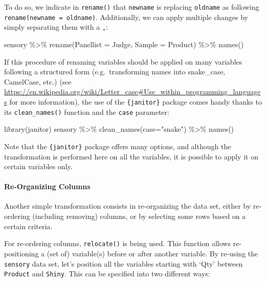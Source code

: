 \documentclass[
]{book}
\newenvironment{Shaded}{\begin{snugshade}}{\end{snugshade}}
\newcommand{\AttributeTok}[1]{\textcolor[rgb]{0.77,0.63,0.00}{#1}}
\newcommand{\FunctionTok}[1]{\textcolor[rgb]{0.00,0.00,0.00}{#1}}
\newcommand{\NormalTok}[1]{#1}
\newcommand{\SpecialCharTok}[1]{\textcolor[rgb]{0.00,0.00,0.00}{#1}}
\newcommand{\StringTok}[1]{\textcolor[rgb]{0.31,0.60,0.02}{#1}}
\begin{document}
To do so, we indicate in \texttt{rename()} that \texttt{newname} is replacing \texttt{oldname} as following \texttt{rename(newname\ =\ oldname)}. Additionally, we can apply multiple changes by simply separating them with a \texttt{,}:

\begin{Shaded}
\begin{Highlighting}[]
\NormalTok{sensory }\SpecialCharTok{\%\textgreater{}\%} 
  \FunctionTok{rename}\NormalTok{(}\AttributeTok{Panellist =}\NormalTok{ Judge, }\AttributeTok{Sample =}\NormalTok{ Product) }\SpecialCharTok{\%\textgreater{}\%} 
  \FunctionTok{names}\NormalTok{()}
\end{Highlighting}
\end{Shaded}

If this procedure of renaming variables should be applied on many variables following a structured form (e.g.~transforming names into snake\_case, CamelCase, etc.) (see \url{https://en.wikipedia.org/wiki/Letter_case\#Use_within_programming_languages} for more information), the use of the \texttt{\{janitor\}} package comes handy thanks to its \texttt{clean\_names()} function and the \texttt{case} parameter:

\begin{Shaded}
\begin{Highlighting}[]
\FunctionTok{library}\NormalTok{(janitor)}
\NormalTok{sensory }\SpecialCharTok{\%\textgreater{}\%} 
  \FunctionTok{clean\_names}\NormalTok{(}\AttributeTok{case=}\StringTok{"snake"}\NormalTok{) }\SpecialCharTok{\%\textgreater{}\%} 
  \FunctionTok{names}\NormalTok{()}
\end{Highlighting}
\end{Shaded}

Note that the \texttt{\{janitor\}} package offers many options, and although the transformation is performed here on all the variables, it is possible to apply it on certain variables only.

\hypertarget{re-organizing-columns}{%
\paragraph{Re-Organizing Columns}\label{re-organizing-columns}}

Another simple transformation consists in re-organizing the data set, either by re-ordering (including removing) columns, or by selecting some rows based on a certain criteria.

For re-ordering columns, \texttt{relocate()} is being used. This function allows re-positioning a (set of) variable(s) before or after another variable. By re-using the \texttt{sensory} data set, let's position all the variables starting with `Qty' between \texttt{Product} and \texttt{Shiny}. This can be specified into two different ways:
\end{document}
